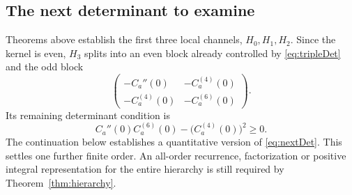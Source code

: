 \subsection{The next determinant to examine}
Theorems above establish the first three local channels, $H_0,H_1,H_2$. Since the kernel is even, $H_3$ splits into an even block already controlled by \eqref{eq:tripleDet} and the odd block
\[
\begin{pmatrix}
-C_a''(0)&-C_a^{(4)}(0)\\
-C_a^{(4)}(0)&-C_a^{(6)}(0)
\end{pmatrix}.
\]
Its remaining determinant condition is
\begin{equation}\label{eq:nextDet}
\boxed{C_a''(0)C_a^{(6)}(0)-\bigl(C_a^{(4)}(0)\bigr)^2\ge0.}
\end{equation}
The continuation below establishes a quantitative version of \eqref{eq:nextDet}. This settles one further finite order. An all-order recurrence, factorization or positive integral representation for the entire hierarchy is still required by Theorem~\ref{thm:hierarchy}.
